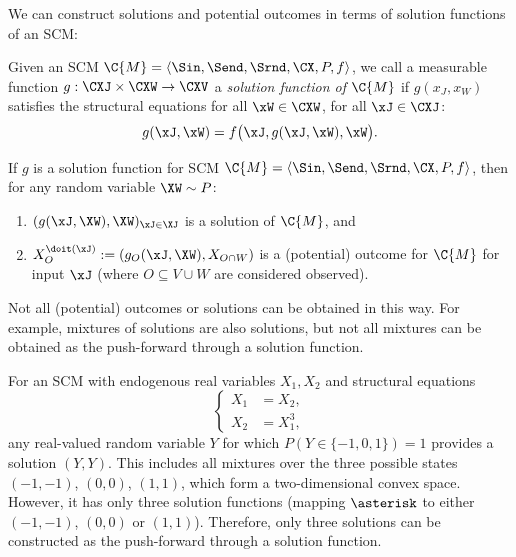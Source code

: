 We can construct solutions and potential outcomes in terms of solution functions of an SCM:
\begin{Def}\label{def:scm_solution_functions}
  Given an SCM $\C{M} = \langle \Sin, \Send, \Srnd, \CX, P, f \rangle$, we call a measurable function
  $g : \CXJ \times \CXW \to \CXV$ a \emph{solution function of $\C{M}$} if $g(x_J,x_W)$ satisfies the structural equations
  for all $\xW\in\CXW$, for all $\xJ\in\CXJ$:
  $$g(\xJ,\xW) = f\big(\xJ, g(\xJ,\xW), \xW\big).$$
\end{Def}
\begin{Rem}
  If $g$ is a solution function for SCM $\C{M} = \langle \Sin, \Send, \Srnd, \CX, P, f \rangle$,
  then for any random variable $\XW \sim P$:
  \begin{enumerate}
    \item
  $(g(\xJ, \XW),\XW)_{\xJ\in\XJ}$ is a solution of $\C{M}$, and 
\item
  $X_O^{\doit(\xJ)} := (g_O(\xJ, \XW),X_{O\cap W})$ is a (potential) outcome for $\C{M}$ for input $\xJ$ (where $O \subseteq V\cup W$ are considered observed).
  \end{enumerate}
\end{Rem}
Not all (potential) outcomes or solutions can be obtained in this way. For example, mixtures of solutions are also solutions,
but not all mixtures can be obtained as the push-forward through a solution function.
\begin{Eg}\label{eg:not_each_solution_from_push_forward}
For an SCM with endogenous real variables $X_1,X_2$ and structural equations 
$$\begin{cases}
  X_1 &= X_2,\\
  X_2 &= X_1^3,
\end{cases}$$
any real-valued random variable $Y$ for which $P(Y \in \{-1,0,1\}) = 1$
provides a solution $(Y,Y)$. This includes all mixtures over the three
possible states $(-1,-1)$, $(0,0)$, $(1,1)$, which form a two-dimensional convex
space. However, it has only three solution functions (mapping $\asterisk$ to
either $(-1,-1)$, $(0,0)$ or $(1,1)$).
Therefore, only three solutions
can be constructed as the push-forward through a solution function.
\end{Eg}

